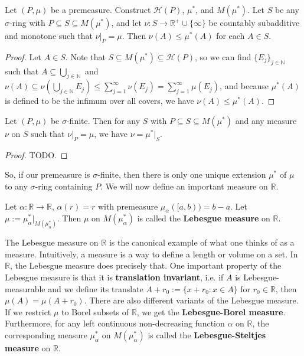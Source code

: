 	\begin{prop}
	Let $(P, \mu)$ be a premeasure. Construct $\mathcal H(P)$, $\mu^*$, and $M(\mu^*)$. Let $S$ be any $\sigma$-ring
	 with $P\subseteq S\subseteq M(\mu^*)$, and let $\nu : S\rightarrow\mathbb R^+\cup\{\infty\}$ be countably subadditive 
	 and monotone such that $\nu|_P = \mu$. Then $\nu(A)\leq \mu^*(A)$ for each $A\in S$. 
	\end{prop}
	
	\begin{proof}
		Let $A\in S$. Note that $S\subseteq M(\mu^*)\subseteq\mathcal H(P)$, so we can find $\{E_j\}_{j\in\mathbb N}$ 
		such that $A\subseteq\bigcup_{j\in\mathbb N}$ and $\nu(A)\subseteq\nu(\bigcup_{j\in\mathbb N} E_j)\leq
		\sum_{j = 1}^\infty\nu(E_j) = \sum_{j = 1}^\infty\mu(E_j)$, and because $\mu^*(A)$ is defined to be the infimum 
		over all covers, we have $\nu(A)\leq\mu^*(A)$. 
	\end{proof}
	
	\begin{theorem}
		Let $(P, \mu)$ be $\sigma$-finite. Then for any $S$ with $P\subseteq S\subseteq M(\mu^*)$ and any measure 
		$\nu$ on $S$ such that $\nu|_P = \mu$, we have $\nu = \mu^*|_S$. 
	\end{theorem}
	
	\begin{proof}
		TODO.
	\end{proof}
	
	So, if our premeasure is $\sigma$-finite, then there is only one unique extension $\mu^*$ of $\mu$ to any $\sigma$-ring 
	containing $P$. We will now define an important measure on $\mathbb R$. 
	
	\begin{definition}
		Let $\alpha : \mathbb R\rightarrow\mathbb R$, $\alpha(r) = r$ with premeasure $\mu_\alpha([a, b)) = b - a$. Let 
		$\mu := \mu_\alpha^*|_{M(\mu_\alpha^*)}$. Then $\mu$ on $M(\mu_\alpha^*)$ is called the \textbf{Lebesgue 
		measure} on $\mathbb R$. 
	\end{definition}
	
	The Lebesgue measure on $\mathbb R$ is the canonical example of what one thinks of as a measure. Intuitively, a 
	measure is a way to define a length or volume on a set. In $\mathbb R$, the Lebesgue measure does precisely that. One 
	important property of the Lebesgue measure is that it is \textbf{translation invariant}, i.e. if $A$ is Lebesgue-measurable 
	and we define its translate $A + r_0 := \{x + r_0 : x\in A\}$ for $r_0\in\mathbb R$, then $\mu(A) = \mu(A + r_0)$. There are 
	also different variants of the Lebesgue measure. If we restrict $\mu$ to Borel subsets of $\mathbb R$, we get the 
	\textbf{Lebesgue-Borel measure}. Furthermore, for any left continuous non-decreasing function $\alpha$ on 
	$\mathbb R$, the corresponding measure $\mu_\alpha^*$ on $M(\mu_\alpha^*)$ is called the \textbf{Lebesgue-Steltjes 
	measure} on $\mathbb R$. 
	
